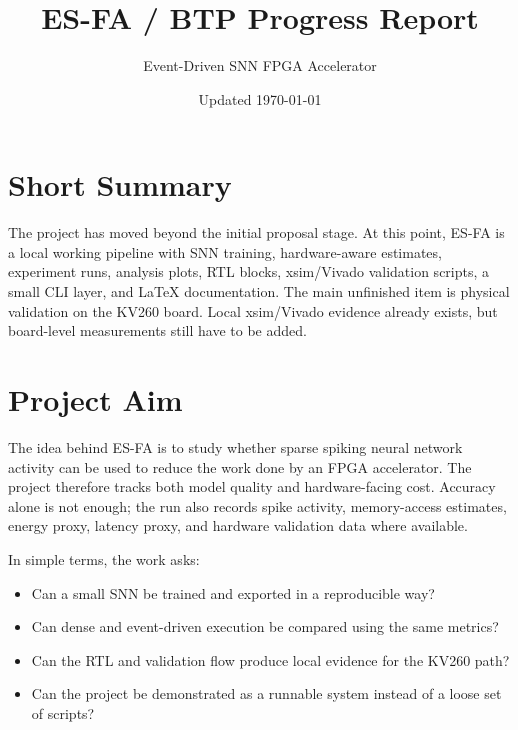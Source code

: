 \documentclass[11pt]{article}
\title{ES-FA / BTP Progress Report}
\author{Event-Driven SNN FPGA Accelerator}
\date{Updated \today}
\begin{document}
\maketitle

\section*{Short Summary}
The project has moved beyond the initial proposal stage. At this point, ES-FA is
a local working pipeline with SNN training, hardware-aware estimates, experiment
runs, analysis plots, RTL blocks, xsim/Vivado validation scripts, a small CLI
layer, and LaTeX documentation. The main unfinished item is physical validation
on the KV260 board. Local xsim/Vivado evidence already exists, but board-level
measurements still have to be added.

\section{Project Aim}
The idea behind ES-FA is to study whether sparse spiking neural network activity
can be used to reduce the work done by an FPGA accelerator. The project therefore
tracks both model quality and hardware-facing cost. Accuracy alone is not enough;
the run also records spike activity, memory-access estimates, energy proxy,
latency proxy, and hardware validation data where available.

In simple terms, the work asks:
\begin{itemize}[leftmargin=*]
\item Can a small SNN be trained and exported in a reproducible way?
\item Can dense and event-driven execution be compared using the same metrics?
\item Can the RTL and validation flow produce local evidence for the KV260 path?
\item Can the project be demonstrated as a runnable system instead of a loose set
of scripts?
\end{itemize}
\end{document}

